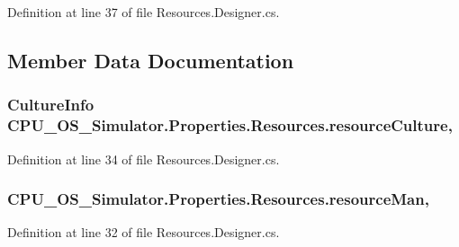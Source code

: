 Definition at line 37 of file Resources.\+Designer.\+cs.



\subsection{Member Data Documentation}
\hypertarget{class_c_p_u___o_s___simulator_1_1_properties_1_1_resources_aec37dbc04f58f227b9900750d2cdddaa}{}
\subsubsection[{resource\+Culture}]{\setlength{\rightskip}{0pt plus 5cm}Culture\+Info C\+P\+U\+\_\+\+O\+S\+\_\+\+Simulator.\+Properties.\+Resources.\+resource\+Culture\hspace{0.3cm}{\ttfamily [static]}, {\ttfamily [private]}}\label{class_c_p_u___o_s___simulator_1_1_properties_1_1_resources_aec37dbc04f58f227b9900750d2cdddaa}


Definition at line 34 of file Resources.\+Designer.\+cs.

\hypertarget{class_c_p_u___o_s___simulator_1_1_properties_1_1_resources_a8362e360ca163bc3fa1a27bf18ff1eb2}{}
\subsubsection[{resource\+Man}]{ C\+P\+U\+\_\+\+O\+S\+\_\+\+Simulator.\+Properties.\+Resources.\+resource\+Man\hspace{0.3cm}{\ttfamily [static]}, {\ttfamily [private]}}\label{class_c_p_u___o_s___simulator_1_1_properties_1_1_resources_a8362e360ca163bc3fa1a27bf18ff1eb2}


Definition at line 32 of file Resources.\+Designer.\+cs.



